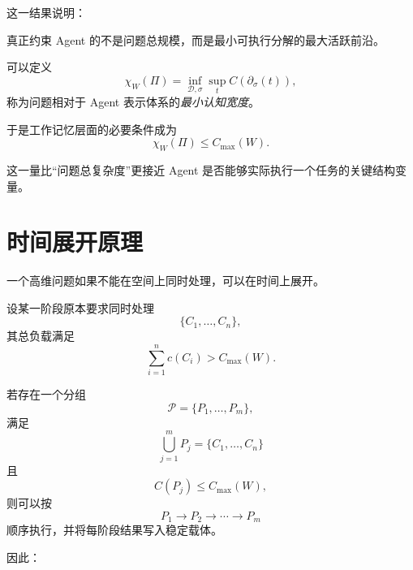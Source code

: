 这一结果说明：

\begin{statementbox}
真正约束 Agent 的不是问题总规模，而是最小可执行分解的最大活跃前沿。
\end{statementbox}

可以定义
\begin{equation}
\chi_W(\Pi)
=
\inf_{\mathcal D,\sigma}
\sup_t
C(
\partial_\sigma(t)
),
\end{equation}
称为问题相对于 Agent 表示体系的\emph{最小认知宽度}。

于是工作记忆层面的必要条件成为
\begin{equation}
\boxed{
\chi_W(\Pi)
\leq
C_{\max}(W).
}
\label{eq:cognitive-width}
\end{equation}

这一量比“问题总复杂度”更接近 Agent 是否能够实际执行一个任务的关键结构变量。

\section{时间展开原理}

一个高维问题如果不能在空间上同时处理，可以在时间上展开。

设某一阶段原本要求同时处理
\begin{equation}
\{C_1,\ldots,C_n\},
\end{equation}
其总负载满足
\begin{equation}
\sum_{i=1}^{n}c(C_i)
>
C_{\max}(W).
\end{equation}

若存在一个分组
\begin{equation}
\mathcal P
=
\{P_1,\ldots,P_m\},
\end{equation}
满足
\begin{equation}
\bigcup_{j=1}^{m}P_j
=
\{C_1,\ldots,C_n\}
\end{equation}
且
\begin{equation}
C(P_j)
\leq
C_{\max}(W),
\end{equation}
则可以按
\begin{equation}
P_1\rightarrow P_2\rightarrow\cdots\rightarrow P_m
\end{equation}
顺序执行，并将每阶段结果写入稳定载体。

因此：

\begin{statementbox}
\centering
{}
\end{statementbox}

